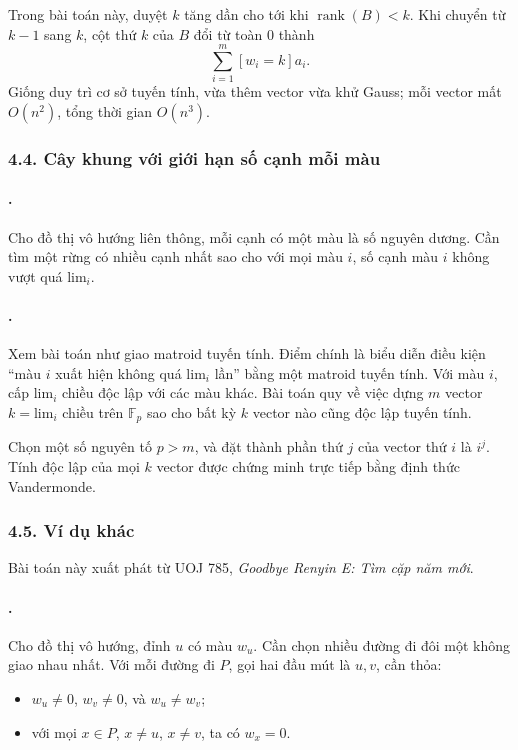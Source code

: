 \documentclass[11pt]{article}
\begin{document}
Trong bài toán này, duyệt \(k\) tăng dần cho tới khi
\(\operatorname{rank}(B)<k\). Khi chuyển từ \(k-1\) sang \(k\), cột thứ \(k\)
của \(B\) đổi từ toàn \(0\) thành
\[
  \sum_{i=1}^{m}[w_i=k]a_i.
\]
Giống duy trì cơ sở tuyến tính, vừa thêm vector vừa khử Gauss; mỗi vector mất
\(O(n^2)\), tổng thời gian \(O(n^3)\).

\subsubsection*{4.4. Cây khung với giới hạn số cạnh mỗi màu}

\paragraph{.}
Cho đồ thị vô hướng liên thông, mỗi cạnh có một màu là số nguyên dương. Cần tìm
một rừng có nhiều cạnh nhất sao cho với mọi màu \(i\), số cạnh màu \(i\) không
vượt quá \(\mathrm{lim}_i\).

\paragraph{.}
Xem bài toán như giao matroid tuyến tính. Điểm chính là biểu diễn điều kiện
``màu \(i\) xuất hiện không quá \(\mathrm{lim}_i\) lần'' bằng một matroid tuyến
tính. Với màu \(i\), cấp \(\mathrm{lim}_i\) chiều độc lập với các màu khác. Bài
toán quy về việc dựng \(m\) vector \(k=\mathrm{lim}_i\) chiều trên
\(\mathbb F_p\) sao cho bất kỳ \(k\) vector nào cũng độc lập tuyến tính.

Chọn một số nguyên tố \(p>m\), và đặt thành phần thứ \(j\) của vector thứ \(i\)
là \(i^j\). Tính độc lập của mọi \(k\) vector được chứng minh trực tiếp bằng
định thức Vandermonde.

\subsubsection*{4.5. Ví dụ khác}

Bài toán này xuất phát từ UOJ 785, \emph{Goodbye Renyin E: Tìm cặp năm mới}.

\paragraph{.}
Cho đồ thị vô hướng, đỉnh \(u\) có màu \(w_u\). Cần chọn nhiều đường đi đôi một
không giao nhau nhất. Với mỗi đường đi \(P\), gọi hai đầu mút là \(u,v\), cần
thỏa:
\begin{itemize}
  \item \(w_u\ne0\), \(w_v\ne0\), và \(w_u\ne w_v\);
  \item với mọi \(x\in P\), \(x\ne u\), \(x\ne v\), ta có \(w_x=0\).
\end{itemize}
\end{document}
